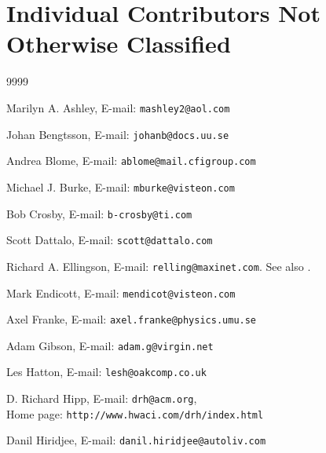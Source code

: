 
\section*{Individual Contributors Not Otherwise Classified}


\begin{thecustombibliography}{9999}

Marilyn A. Ashley,
E-mail: \texttt{mashley2@aol.com}

Johan Bengtsson,
E-mail: \texttt{johanb@docs.uu.se}

Andrea Blome,
E-mail: \texttt{ablome@mail.cfigroup.com}

Michael J. Burke,
E-mail: \texttt{mburke@visteon.com}

Bob Crosby,
E-mail: \texttt{b-crosby@ti.com}

Scott Dattalo,
E-mail: \texttt{scott@dattalo.com}

Richard A. Ellingson,
E-mail: \texttt{relling@maxinet.com}.  See also
\cite{bibref:w:ellingsoncrc32pages}.

Mark Endicott,
E-mail: \texttt{mendicot@visteon.com}

Axel Franke,
E-mail: \texttt{axel.franke@physics.umu.se}

Adam Gibson,
E-mail: \texttt{adam.g@virgin.net}

Les Hatton,
E-mail: \texttt{lesh@oakcomp.co.uk}

D. Richard Hipp,
E-mail: \texttt{drh@acm.org}, \\
Home page: \texttt{http://www.hwaci.com/drh/index.html}

Danil Hiridjee,
E-mail: \texttt{danil.hiridjee@autoliv.com}


\end{thecustombibliography}
